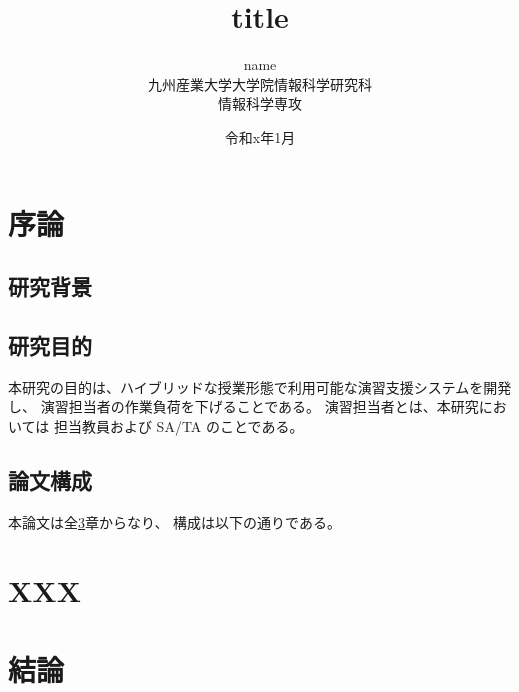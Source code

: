 \documentclass[uplatex,a4paper,12pt]{jsreport}
\title{
 \Huge{title}
 \vspace{4.5cm}\\
}
\author{
 \LARGE{name}\vspace{2cm}\\
 \LARGE{九州産業大学大学院情報科学研究科}\vspace{0.5cm}\\
 \LARGE{情報科学専攻}\vspace{1cm}\\
}
\date{\LARGE{令和x年1月}}
\begin{document}
\maketitle
\setcounter{page}{0}
\tableofcontents
\listoffigures
\listoftables
\clearpage
\setcounter{page}{0}


\chapter{序論}\label{chap:introduction}

\section{研究背景}\label{sec:background}

\section{研究目的}\label{sec:object}
本研究の目的は、ハイブリッドな授業形態で利用可能な演習支援システムを開発し、
演習担当者の作業負荷を下げることである。
演習担当者とは、本研究においては
担当教員および SA/TA のことである。

\section{論文構成}\label{sec:structure}

本論文は全\ref{chap:conclusion}章からなり、
構成は以下の通りである。


\chapter{XXX}\label{chap:xxx}

\chapter{結論}\label{chap:conclusion}


\end{document}
